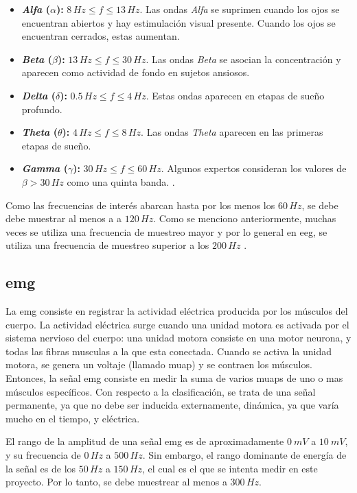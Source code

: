 \begin{itemize}
 \item \textbf{\emph{Alfa} ($\alpha$):} $ 8 \, Hz \leq f \leq 13 \, Hz$. Las ondas \emph{Alfa} se suprimen cuando los ojos se encuentran abiertos y hay estimulación visual presente. Cuando los ojos se encuentran cerrados, estas aumentan.
 \item \textbf{\emph{Beta} ($\beta$):} $ 13 \, Hz \leq f \leq 30 \, Hz$. Las ondas \emph{Beta} se asocian la concentración y aparecen como actividad de fondo en sujetos ansiosos. 
 \item \textbf{\emph{Delta} ($\delta$):} $ 0.5 \, Hz \leq f \leq 4 \, Hz$. Estas ondas aparecen en etapas de sueño profundo.
 \item \textbf{\emph{Theta} ($\theta$):} $ 4 \, Hz \leq f \leq 8 \, Hz$. Las ondas \emph{Theta} aparecen en las primeras etapas de sueño.
 \item \textbf{\emph{Gamma} ($\gamma$):} $ 30 \, Hz \leq f \leq 60 \, Hz $. Algunos expertos consideran los valores de $\beta > 30 \, Hz $ como una quinta banda. \cite{neural-eng}.
\end{itemize}

Como las frecuencias de interés abarcan hasta por los menos los $60 \, Hz$, se debe debe muestrar al menos a a $120 \, Hz$. Como se menciono anteriormente, muchas veces se utiliza una frecuencia de muestreo mayor y por lo general en \acrshort{eeg}, se utiliza una frecuencia de muestreo superior a los $200 \, Hz$ \cite{neural-eng}.

\subsection{\gls{emg}}

La \gls{emg} consiste en registrar la actividad eléctrica producida por los músculos del cuerpo. La actividad eléctrica surge cuando una unidad motora es activada por el sistema nervioso del cuerpo: una unidad motora consiste en una motor neurona, y todas las fibras musculas a la que esta conectada.  Cuando se activa la unidad motora, se genera un voltaje (llamado \acrshort{muap}) y se contraen los músculos.  Entonces, la señal \acrshort{emg} consiste en medir la suma de varios \acrshort{muap}s de uno o mas músculos específicos. Con respecto a la clasificación, se trata de una señal permanente, ya que no debe ser inducida externamente, dinámica, ya que varía mucho en el tiempo, y eléctrica.

El rango de la amplitud de una señal \acrshort{emg} es de aproximadamente $0\ mV$ a $10\ mV$, y su frecuencia de $0\, Hz$ a $500\, Hz$.  Sin embargo, el rango dominante de energía de la señal es de los $50\, Hz$ a $150\, Hz$, el cual es el que se intenta medir en este proyecto. Por lo tanto, se debe muestrear al menos a $300 \, Hz$.

